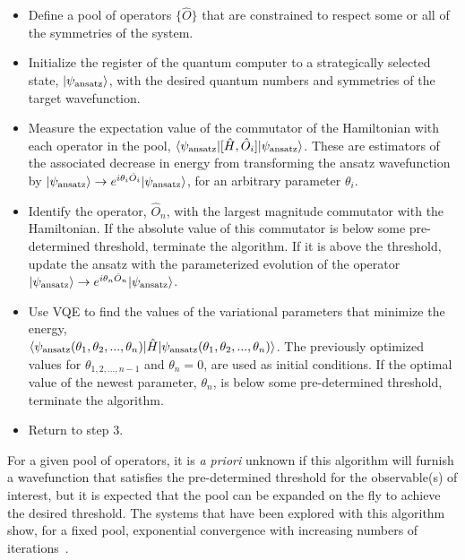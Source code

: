 \documentclass[aps, pra, onecolumn, tightenlines, letterpaper, amsmath, amssymb, preprintnumbers, floatfix, longbibliography, nofootinbib]{revtex4-2}
\begin{document}
\begin{itemize}
    \item[1.] Define a pool of operators $\{ \hat{O} \}$ that are 
    constrained to respect some or all of the symmetries of the system. 
    \item[2.] Initialize the register of the quantum computer to a strategically selected state, 
    $|\psi_{{\rm ansatz}} \rangle$,  with the desired quantum numbers
   and symmetries of the target wavefunction.
    \item[3.] Measure the expectation value of the commutator of the Hamiltonian with each operator in the pool, 
    $\langle \psi_{{\rm ansatz}} \lvert [\hat{H}, \hat{O}_i] \lvert \psi_{{\rm ansatz}} \rangle$. 
    These are estimators of the associated decrease in energy from 
    transforming the  ansatz wavefunction by 
    $\lvert \psi_{{\rm ansatz}} \rangle \to e^{i \theta_i \hat{O}_i}\lvert \psi_{{\rm ansatz}} \rangle$,
    for an arbitrary parameter $\theta_i$.
    \item[4.] 
    Identify the operator, $\hat{O}_n$, with the largest magnitude commutator with the Hamiltonian.
    If the absolute value of this commutator is below some pre-determined threshold, terminate the algorithm. 
    If it is above the threshold, 
    update the ansatz with the parameterized evolution of the operator $\lvert \psi_{{\rm ansatz}} \rangle \to e^{i \theta_n \hat{O}_n}\lvert \psi_{{\rm ansatz}} \rangle$.
    \item[5.] Use VQE to find the values of the variational parameters that minimize the energy,  \\
    $\langle\psi_{{\rm ansatz}} (\theta_{1}, \theta_{2},..., \theta_n)\rvert \hat{H}\lvert\psi_{{\rm ansatz}} (\theta_{1}, \theta_{2},..., \theta_n)\rangle$.
    The previously optimized values for $\theta_{1,2,...,n-1}$
    and $\theta_n=0$, are used as initial conditions. 
    If the optimal value of the newest parameter, $\theta_n$, is below some pre-determined threshold, terminate the algorithm.
    \item[6.] Return to step 3.
\end{itemize}
%
For a given pool of operators, it is {\it a priori} 
unknown if this algorithm will furnish a wavefunction that satisfies the 
pre-determined threshold
for the observable(s) of interest,
but it is expected that the  pool can be expanded on the fly to 
achieve the desired threshold.
The systems that have been explored with this algorithm show,
for a fixed pool,
exponential convergence with increasing numbers of iterations~\cite{Grimsley_2019,Tang:2021PRX,Bertels:2022oga,Romero:2022blx,Feniou:2023gvo}.
\end{document}
